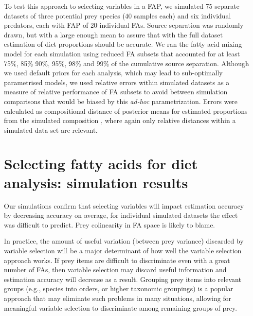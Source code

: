 \documentclass[12pt]{article}
\begin{document}
To test this approach to selecting variables in a FAP, we simulated
75 separate datasets of three potential prey species (40 samples each) and six individual
predators, each with FAP of 20 individual FAs. Source separation was
randomly drawn, but with a large enough mean to assure that with the
full dataset estimation of diet proportions should be accurate. We ran the fatty acid 
mixing model for each simulation using reduced FA subsets that accounted for at least 75\%, 85\%
90\%, 95\%, 98\% and 99\% of the cumulative source
separation. Although we used
default priors for each analysis, which may lead to sub-optimally
parametrised models, we used relative errors within simulated datasets
as a measure of relative performance of FA subsets to avoid between
simulation comparisons that would be biased by this \emph{ad-hoc}
parametrization. Errors were calculated as compositional distance of
posterior means for estimated proportions from
the simulated composition \cite{aitchison_logratio_2000}, where again
only relative distances within a simulated data-set are
relevant.

\section{Selecting fatty acids for diet analysis: simulation results}

Our simulations confirm that selecting variables will impact
estimation accuracy by decreasing accuracy on average, for individual
simulated datasets the effect was difficult to predict. Prey
colinearity in FA space is likely to blame.

In practice, the amount of useful variation (between prey variance) discarded by variable selection will be a major determinant of how well the variable selection approach works. If prey items are difficult to discriminate even with a great number of FAs, then variable selection may discard useful information and estimation accuracy will decrease as a result. Grouping prey items into relevant groups (e.g., species into orders, or higher taxonomic groupings) is a popular approach that may eliminate such problems in many situations, allowing for meaningful variable selection to discriminate among remaining groups of prey.
\end{document}
